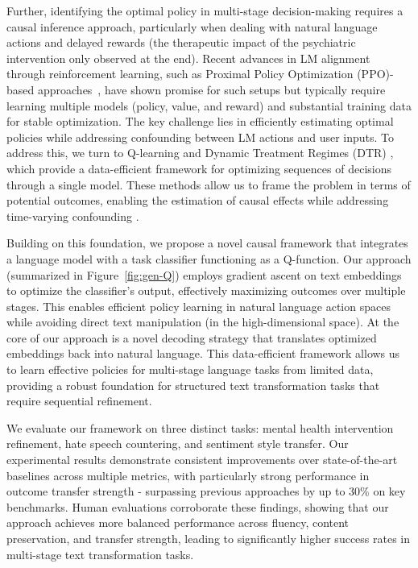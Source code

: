 \documentclass{article}
\begin{document}
Further, identifying the optimal policy in multi-stage decision-making requires a causal inference approach, particularly when dealing with natural language actions and delayed rewards (the therapeutic impact of the psychiatric intervention only observed at the end). Recent advances in LM alignment through reinforcement learning, such as Proximal Policy Optimization (PPO)-based approaches~\cite{InstructGPT,ConstitutionalAI}, have shown promise for such setups but typically require learning multiple models (policy, value, and reward) and substantial training data for stable optimization. The key challenge lies in efficiently estimating optimal policies while addressing confounding between LM actions and user inputs. To address this, we turn to Q-learning and Dynamic Treatment Regimes (DTR) \cite{watkins1989learning,murphy2003optimal}, which provide a data-efficient framework for optimizing sequences of decisions through a single model. These methods allow us to frame the problem in terms of potential outcomes, enabling the estimation of causal effects while addressing time-varying confounding \cite{robins2004optimal,hernan2020causal}.


Building on this foundation, we propose a novel causal framework that integrates a language model with a task classifier functioning as a Q-function. Our approach (summarized in Figure~\ref{fig:gen-Q}) employs gradient ascent on text embeddings to optimize the classifier's output, effectively maximizing outcomes over multiple stages. This enables efficient policy learning in natural language action spaces while avoiding direct text manipulation (in the high-dimensional space). At the core of our approach is a novel decoding strategy that translates optimized embeddings back into natural language. 
This data-efficient framework allows us to learn effective policies for multi-stage language tasks from limited data, providing a robust foundation for structured text transformation tasks that require sequential refinement.



We evaluate our framework on three distinct tasks: mental health intervention refinement, hate speech countering, and sentiment style transfer. Our experimental results demonstrate consistent improvements over state-of-the-art baselines across multiple metrics, with particularly strong performance in outcome transfer strength - surpassing previous approaches by up to 30\% on key benchmarks. Human evaluations corroborate these findings, showing that our approach achieves more balanced performance across fluency, content preservation, and transfer strength, leading to significantly higher success rates in multi-stage text transformation tasks.
\end{document}
